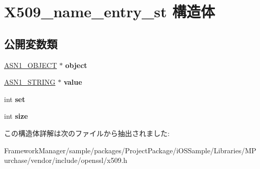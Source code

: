 \hypertarget{struct_x509__name__entry__st}{}\section{X509\+\_\+name\+\_\+entry\+\_\+st 構造体}
\label{struct_x509__name__entry__st}
\subsection*{公開変数類}
\begin{DoxyCompactItemize}
\item 
\hypertarget{struct_x509__name__entry__st_afb5c2cccc0186d9b6c232d1abee1600d}{}\hyperlink{structasn1__object__st}{A\+S\+N1\+\_\+\+O\+B\+J\+E\+C\+T} $\ast$ {\bfseries object}\label{struct_x509__name__entry__st_afb5c2cccc0186d9b6c232d1abee1600d}

\item 
\hypertarget{struct_x509__name__entry__st_ac667219a50c24b022ad59fbd4b0161dd}{}\hyperlink{structasn1__string__st}{A\+S\+N1\+\_\+\+S\+T\+R\+I\+N\+G} $\ast$ {\bfseries value}\label{struct_x509__name__entry__st_ac667219a50c24b022ad59fbd4b0161dd}

\item 
\hypertarget{struct_x509__name__entry__st_a9c2a931466331baa5b1566029e4e2159}{}int {\bfseries set}\label{struct_x509__name__entry__st_a9c2a931466331baa5b1566029e4e2159}

\item 
\hypertarget{struct_x509__name__entry__st_a26441098da53088784c4eb95d3a2d2f7}{}int {\bfseries size}\label{struct_x509__name__entry__st_a26441098da53088784c4eb95d3a2d2f7}

\end{DoxyCompactItemize}


この構造体詳解は次のファイルから抽出されました\+:\begin{DoxyCompactItemize}
\item 
Framework\+Manager/sample/packages/\+Project\+Package/i\+O\+S\+Sample/\+Libraries/\+M\+Purchase/vendor/include/openssl/x509.\+h\end{DoxyCompactItemize}
